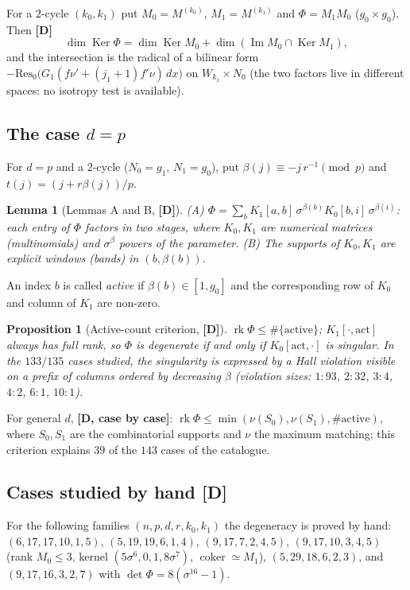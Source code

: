 \documentclass[11pt,a4paper]{article}
\newtheorem{proposition}[theorem]{Proposition}
\newtheorem{lemma}[theorem]{Lemma}
\DeclareMathOperator{\Ker}{Ker}
\begin{document}
For a $2$-cycle $(k_0,k_1)$ put $M_0=M^{(k_0)}$, $M_1=M^{(k_1)}$ and
$\Phi=M_1M_0$ ($g_0\times g_0$). Then \textbf{[D]}
$$\dim\Ker\Phi=\dim\Ker M_0+\dim(\operatorname{Im}M_0\cap\Ker M_1),$$
and the intersection is the radical of a bilinear form
$-\mathrm{Res}_0\big(G_1(f\nu'+(j_1+1)f'\nu)\,dx\big)$ on $W_{k_1}\times N_0$
(the two factors live in different spaces: no isotropy test is available).

\subsection*{The case $d=p$}

For $d=p$ and a $2$-cycle ($N_0=g_1$, $N_1=g_0$), put
$\beta(j)\equiv -j\,r^{-1}\pmod p$ and $t(j)=(j+r\beta(j))/p$.

\begin{lemma}[Lemmas A and B, \textbf{[D]}]
\label{lem:AB}
(A) $\Phi=\sum_b K_1[a,b]\,\sigma^{\beta(b)}K_0[b,i]\,\sigma^{\beta(i)}$: each
entry of $\Phi$ factors in two stages, where $K_0,K_1$ are numerical matrices
(multinomials) and $\sigma^{\beta}$ powers of the parameter. (B) The supports of
$K_0,K_1$ are explicit \emph{windows} (bands) in $(b,\beta(b))$.
\end{lemma}

An index $b$ is called \emph{active} if $\beta(b)\in[1,g_0]$ and the
corresponding row of $K_0$ and column of $K_1$ are non-zero.

\begin{proposition}[Active-count criterion, \textbf{[D]}]
$\operatorname{rk}\Phi\le\#\{\text{active}\}$; $K_1[\cdot,\mathrm{act}]$ always
has full rank, so $\Phi$ is degenerate \emph{if and only if}
$K_0[\mathrm{act},\cdot]$ is singular. In the $133/135$ cases studied, the
singularity is expressed by a Hall violation visible on a prefix of columns
ordered by decreasing $\beta$ (violation sizes: $1{:}93$, $2{:}32$, $3{:}4$,
$4{:}2$, $6{:}1$, $10{:}1$).
\end{proposition}

For general $d$, \textbf{[D, case by case]}:
$\operatorname{rk}\Phi\le\min(\nu(S_0),\nu(S_1),\#\text{active})$, where
$S_0,S_1$ are the combinatorial supports and $\nu$ the maximum matching; this
criterion explains $39$ of the $143$ cases of the catalogue.

\subsection*{Cases studied by hand \textbf{[D]}}
For the following families $(n,p,d,r,k_0,k_1)$ the degeneracy is proved by hand:
$(6,17,17,10,1,5)$, $(5,19,19,6,1,4)$, $(9,17,7,2,4,5)$, $(9,17,10,3,4,5)$ (rank
$M_0\le3$, kernel $(5\sigma^6,0,1,8\sigma^7)$, $\operatorname{coker}\simeq M_1$),
$(5,29,18,6,2,3)$, and $(9,17,16,3,2,7)$ with $\det\Phi=8(\sigma^{16}-1)$.
\end{document}
